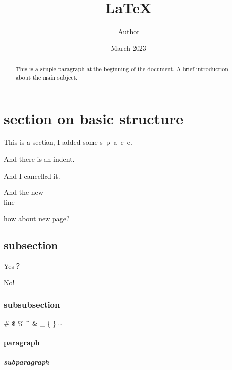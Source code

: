\documentclass[12pt, letterpaper]{article}
\title{LaTeX}
\author{Author}
\date{March 2023} %
\begin{document}
\maketitle

\begin{abstract}
This is a simple paragraph at the beginning of the 
document. A brief introduction about the main subject.
\end{abstract}

\tableofcontents

\newpage


\section{section on basic structure}

This is a section, I added some s\ p\ a\ c\ e.

And there is an indent.

\noindent And I cancelled it.

And the new \\ line

how about new page?

\newpage




\setlength{\parindent}{0pt}

\subsection{subsection}

Yes？

No!

\subsubsection{subsubsection}

 \# \$ \% \^{} \& \_ \{ \} \~{}

\paragraph{paragraph}

\subparagraph{subparagraph}

\newpage
\end{document}
